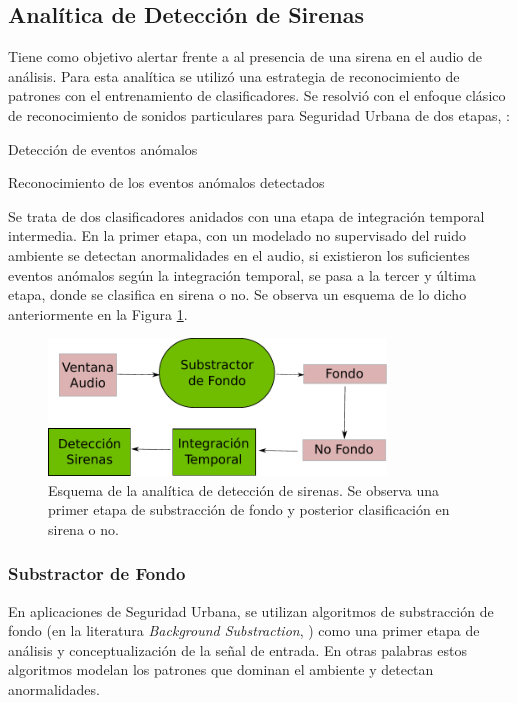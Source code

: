 \documentclass{article}
\begin{document}
\subsection{Analítica de Detección de Sirenas}
\label{deteccion de sirenas}
Tiene como objetivo alertar frente a al presencia de una sirena en el audio de análisis. Para esta analítica se utilizó una estrategia de reconocimiento de patrones con el entrenamiento de clasificadores. Se resolvió con el enfoque clásico de reconocimiento de sonidos particulares para Seguridad Urbana de dos etapas, \cite{lecomte2011abnormal}:
\begin{enumerate}
\begin{item}
Detección de eventos anómalos
\end{item}
\begin{item}
Reconocimiento de los eventos anómalos detectados
\end{item}
\end{enumerate}

Se trata de dos clasificadores anidados con una etapa de integración temporal intermedia. En la primer etapa, con un modelado no supervisado del ruido ambiente se detectan anormalidades en el audio, si existieron los suficientes eventos anómalos según la integración temporal, se pasa a la tercer y última etapa, donde se clasifica en sirena o no. Se observa un esquema de lo dicho anteriormente en la Figura \ref{fig:deteccion_sirenas}. 
 
\begin{figure}[h]
\begin{center}
\includegraphics[width=0.8\textwidth]{deteccion_sirenas} 
\caption{Esquema de la analítica de detección de sirenas. Se observa una primer etapa de substracción de fondo y posterior clasificación en sirena o no.}
\label{fig:deteccion_sirenas}
\end{center}
\end{figure}

\subsubsection{Substractor de Fondo}
En aplicaciones de Seguridad Urbana, se utilizan algoritmos de substracción de fondo (en la literatura \textit{Background Substraction}, \cite{Crocco:2016:ASS:2891449.2871183}) como una primer etapa de análisis y conceptualización de la señal de entrada. En otras palabras estos algoritmos modelan los patrones que dominan el ambiente y detectan anormalidades.
\smallskip 
\end{document}
